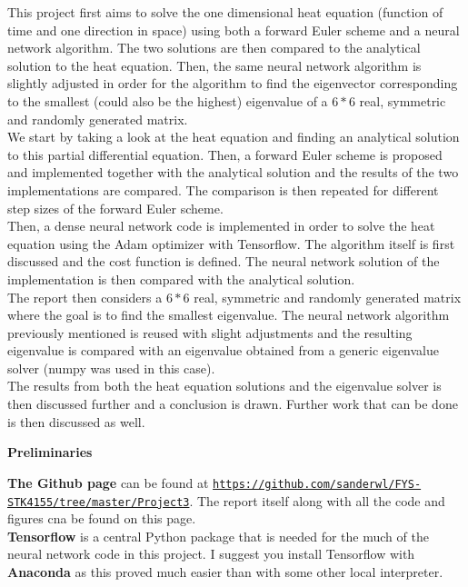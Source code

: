 \documentclass[12pt,a4paper]{article}
\begin{document}
\noindent This project first aims to solve the one dimensional heat equation (function of time and one direction in space) using both a forward Euler scheme and a neural network algorithm. The two solutions are then compared to the analytical solution to the heat equation. Then, the same neural network algorithm is slightly adjusted in order for the algorithm to find the eigenvector corresponding to the smallest (could also be the highest) eigenvalue of a $6*6$ real, symmetric and randomly generated matrix.
\\
We start by taking a look at the heat equation and finding an analytical solution to this partial differential equation. Then, a forward Euler scheme is proposed and implemented together with the analytical solution and the results of the two implementations are compared. The comparison is then repeated for different step sizes of the forward Euler scheme.
\\
Then, a dense neural network code is implemented in order to solve the heat equation using the Adam optimizer with Tensorflow. The algorithm itself is first discussed and the cost function is defined. The neural network solution of the implementation is then compared with the analytical solution.
\\
The report then considers a $6*6$ real, symmetric and randomly generated matrix where the goal is to find the smallest eigenvalue. The neural network algorithm previously mentioned is reused with slight adjustments and the resulting eigenvalue is compared with an eigenvalue obtained from a generic eigenvalue solver (numpy was used in this case).
\\
The results from both the heat equation solutions and the eigenvalue solver is then discussed further and a conclusion is drawn. Further work that can be done is then discussed as well. 

\newpage

\begin{center}
\Large{\textbf{Preliminaries}}
\end{center}

\noindent \textbf{The Github page} can be found at \href{{https://github.com/sanderwl/FYS-STK4155/tree/master/Project3}}{\nolinkurl{https://github.com/sanderwl/FYS-STK4155/tree/master/Project3}}. The report itself along with all the code and figures cna be found on this page.
\\
\textbf{Tensorflow} is a central Python package that is needed for the much of the neural network code in this project. I suggest you install Tensorflow with \textbf{Anaconda} as this proved much easier than with some other local interpreter.
\end{document}
